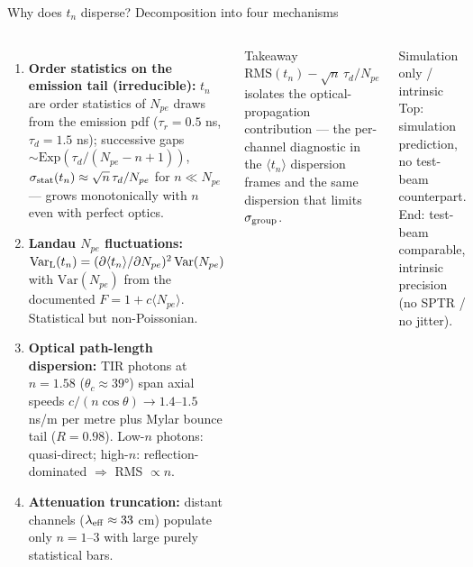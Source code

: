 \documentclass[aspectratio=169]{beamer}
\begin{document}
\begin{frame}{Why does $t_n$ disperse? Decomposition into four mechanisms}

\begin{columns}[T]
\begin{enumerate}\scriptsize
 \item \textbf{Order statistics on the emission tail (irreducible):}
       $t_n$ are order statistics of $N_{pe}$ draws from the emission pdf
       ($\tau_r=0.5$ ns, $\tau_d=1.5$ ns); successive gaps
       $\sim\mathrm{Exp}(\tau_d/(N_{pe}-n+1))$,
       $\sigma_{\rm stat}(t_n)\approx\sqrt{n}\,\tau_d/N_{pe}$ for $n\!\ll\!N_{pe}$
       --- grows monotonically with $n$ even with perfect optics.
 \item \textbf{Landau $N_{pe}$ fluctuations:}
       $\mathrm{Var}_{\rm L}(t_n)=(\partial\langle t_n\rangle/\partial N_{pe})^2\,\mathrm{Var}(N_{pe})$
       with $\mathrm{Var}(N_{pe})$ from the documented $F=1+c\langle N_{pe}\rangle$.
       Statistical but non-Poissonian.
 \item \textbf{Optical path-length dispersion:}
       TIR photons at $n=1.58$ ($\theta_c\approx39°$) span axial speeds
       $c/(n\cos\theta)\to1.4$--$1.5$ ns/m per metre plus Mylar bounce tail ($R=0.98$).
       Low-$n$ photons: quasi-direct; high-$n$: reflection-dominated $\Rightarrow$ RMS $\propto n$.
 \item \textbf{Attenuation truncation:}
       distant channels ($\lambda_{\rm eff}\approx33$ cm) populate only $n=1$--$3$
       with large purely statistical bars.
\end{enumerate}
\begin{block}{\footnotesize Takeaway}
\scriptsize
$\mathrm{RMS}(t_n) - \sqrt{n}\,\tau_d/N_{pe}$ isolates the optical-propagation
contribution --- the per-channel diagnostic in the $\langle t_n\rangle$ dispersion
frames and the same dispersion that limits $\sigma_{\rm group}$.
\end{block}
\begin{alertblock}{\footnotesize Simulation only / intrinsic}
\scriptsize
Top: simulation prediction, no test-beam counterpart.
End: test-beam comparable, intrinsic precision (no SPTR / no jitter).
\end{alertblock}
\end{columns}

\end{frame}
\end{document}
